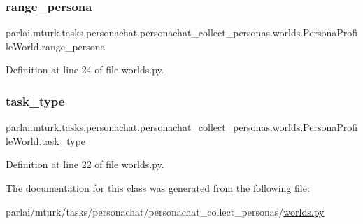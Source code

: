 \subsubsection{\texorpdfstring{range\+\_\+persona}{range\_persona}}
{\footnotesize\ttfamily parlai.\+mturk.\+tasks.\+personachat.\+personachat\+\_\+collect\+\_\+personas.\+worlds.\+Persona\+Profile\+World.\+range\+\_\+persona}



Definition at line 24 of file worlds.\+py.

\mbox{\label{classparlai_1_1mturk_1_1tasks_1_1personachat_1_1personachat__collect__personas_1_1worlds_1_1PersonaProfileWorld_a5d3fcb3260cb4234fead9654ab40f150}} 
\subsubsection{\texorpdfstring{task\+\_\+type}{task\_type}}
{\footnotesize\ttfamily parlai.\+mturk.\+tasks.\+personachat.\+personachat\+\_\+collect\+\_\+personas.\+worlds.\+Persona\+Profile\+World.\+task\+\_\+type}



Definition at line 22 of file worlds.\+py.



The documentation for this class was generated from the following file\+:\begin{DoxyCompactItemize}
\item 
parlai/mturk/tasks/personachat/personachat\+\_\+collect\+\_\+personas/\hyperlink{parlai_2mturk_2tasks_2personachat_2personachat__collect__personas_2worlds_8py}{worlds.\+py}\end{DoxyCompactItemize}
